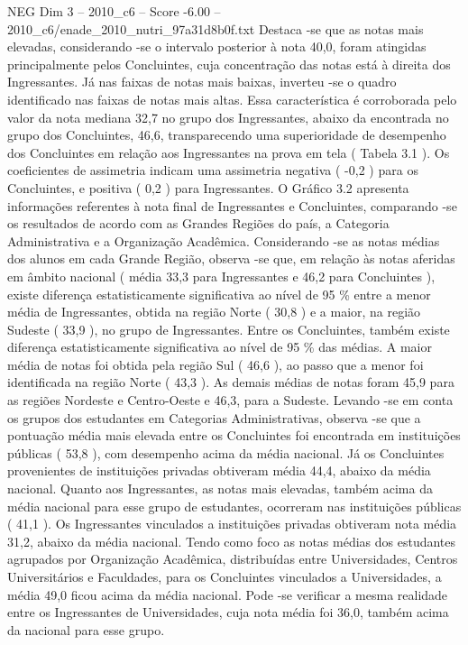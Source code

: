 \begin{textsample}{NEG Dim 3 – 2010\_c6 – Score -6.00 – 2010\_c6/enade\_2010\_nutri\_97a31d8b0f.txt}
Destaca -se que as notas mais elevadas, considerando -se o intervalo posterior à nota 40,0, foram atingidas principalmente pelos Concluintes, cuja concentração das notas está à direita dos Ingressantes.
Já nas faixas de notas mais baixas, inverteu -se o quadro identificado nas faixas de notas mais altas.
Essa característica é corroborada pelo valor da nota mediana 32,7 no grupo dos Ingressantes, abaixo da encontrada no grupo dos Concluintes, 46,6, transparecendo uma superioridade de desempenho dos Concluintes em relação aos Ingressantes na prova em tela ( Tabela 3.1 ).
Os coeficientes de assimetria indicam uma assimetria negativa ( -0,2 ) para os Concluintes, e positiva ( 0,2 ) para Ingressantes.
O Gráfico 3.2 apresenta informações referentes à nota final de Ingressantes e Concluintes, comparando -se os resultados de acordo com as Grandes Regiões do país, a Categoria Administrativa e a Organização Acadêmica.
Considerando -se as notas médias dos alunos em cada Grande Região, observa -se que, em relação às notas aferidas em âmbito nacional ( média 33,3 para Ingressantes e 46,2 para Concluintes ), existe diferença estatisticamente significativa ao nível de 95 \% entre a menor média de Ingressantes, obtida na região Norte ( 30,8 ) e a maior, na região Sudeste ( 33,9 ), no grupo de Ingressantes.
Entre os Concluintes, também existe diferença estatisticamente significativa ao nível de 95 \% das médias.
A maior média de notas foi obtida pela região Sul ( 46,6 ), ao passo que a menor foi identificada na região Norte ( 43,3 ).
As demais médias de notas foram 45,9 para as regiões Nordeste e Centro-Oeste e 46,3, para a Sudeste.
Levando -se em conta os grupos dos estudantes em Categorias Administrativas, observa -se que a pontuação média mais elevada entre os Concluintes foi encontrada em instituições públicas ( 53,8 ), com desempenho acima da média nacional.
Já os Concluintes provenientes de instituições privadas obtiveram média 44,4, abaixo da média nacional.
Quanto aos Ingressantes, as notas mais elevadas, também acima da média nacional para esse grupo de estudantes, ocorreram nas instituições públicas ( 41,1 ).
Os Ingressantes vinculados a instituições privadas obtiveram nota média 31,2, abaixo da média nacional.
Tendo como foco as notas médias dos estudantes agrupados por Organização Acadêmica, distribuídas entre Universidades, Centros Universitários e Faculdades, para os Concluintes vinculados a Universidades, a média 49,0 ficou acima da média nacional.
Pode -se verificar a mesma realidade entre os Ingressantes de Universidades, cuja nota média foi 36,0, também acima da nacional para esse grupo.

\end{textsample}
